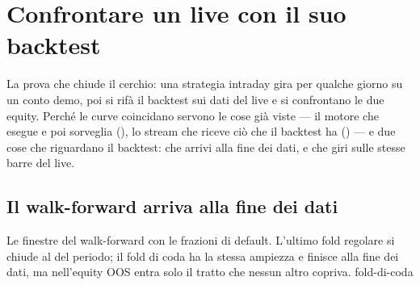 \section{Confrontare un live con il suo backtest}\label{sez:live-confronto}

La prova che chiude il cerchio: una strategia intraday gira per qualche
giorno su un conto demo, poi si rifà il backtest sui dati del live e si
confrontano le due equity. Perché le curve coincidano servono le cose già
viste --- il motore che esegue e poi sorveglia (), lo
stream che riceve ciò che il backtest ha () --- e due
cose che riguardano il backtest: che arrivi alla fine dei dati, e che giri
sulle stesse barre del live.

\subsection{Il walk-forward arriva alla fine dei dati}

  {Le finestre del walk-forward con le frazioni di default. L'ultimo fold
   regolare si chiude al  del periodo; il fold di coda ha la stessa
   ampiezza e finisce alla fine dei dati, ma nell'equity OOS entra solo il
   tratto che nessun altro copriva.}
  {fold-di-coda}


